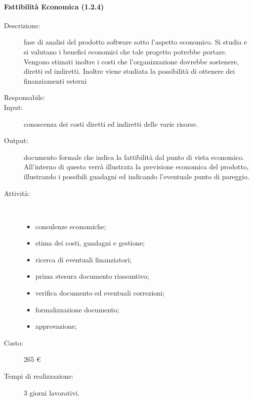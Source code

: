 \begin{description}
\paragraph{Fattibilit\`{a} Economica (1.2.4)}
\begin{description}
\item[Descrizione:] fase di analisi del prodotto software sotto l'aspetto economico. Si studia e si valutano i benefici economici che tale progetto potrebbe portare. Vengono stimati inoltre i costi che l'organizzazione dovrebbe sostenere, diretti ed indiretti. Inoltre viene studiata la possibilit\`{a} di ottenere dei finanziamenti esterni 
\item[Responsabile:] 
\item[Input:] conoscenza dei costi diretti ed indiretti delle varie risorse.
\item[Output:] documento formale che indica la fattibilità dal punto di vista economico. All'interno di questo verrà illustrata la previsione economica del prodotto, illustrando i possibili guadagni ed indicando l'eventuale punto di pareggio.
\item[Attività:]\mbox{}\\[-1.5\baselineskip]
	\begin{itemize}
	\item consulenze economiche;
	\item stima dei costi, guadagni e gestione;
	\item ricerca di eventuali finanziatori;
	\item prima stesura documento riassuntivo;
	\item verifica documento ed eventuali correzioni;
	\item formalizzazione documento;
	\item approvazione;
	\end{itemize}
\item[Costo:] 265 \euro{}
\item[Tempi di realizzazione:] 3 giorni lavorativi.
\end{description}


\end{description}
